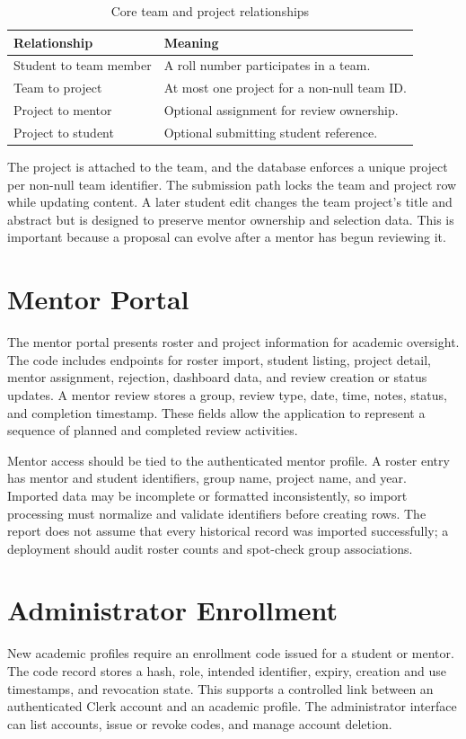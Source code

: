 \documentclass[12pt,a4paper]{report}
\begin{document}
\begin{table}[htbp]\centering\caption{Core team and project relationships}\label{tab:relationships}
\begin{tabular}{p{}p{}}\hline
Relationship & Meaning\\\hline
Student to team member & A roll number participates in a team.\\
Team to project & At most one project for a non-null team ID.\\
Project to mentor & Optional assignment for review ownership.\\
Project to student & Optional submitting student reference.\\\hline
\end{tabular}\end{table}
The project is attached to the team, and the database enforces a unique project per non-null team identifier. The submission path locks the team and project row while updating content. A later student edit changes the team project's title and abstract but is designed to preserve mentor ownership and selection data. This is important because a proposal can evolve after a mentor has begun reviewing it.


\section{Mentor Portal}
The mentor portal presents roster and project information for academic oversight. The code includes endpoints for roster import, student listing, project detail, mentor assignment, rejection, dashboard data, and review creation or status updates. A mentor review stores a group, review type, date, time, notes, status, and completion timestamp. These fields allow the application to represent a sequence of planned and completed review activities.

Mentor access should be tied to the authenticated mentor profile. A roster entry has mentor and student identifiers, group name, project name, and year. Imported data may be incomplete or formatted inconsistently, so import processing must normalize and validate identifiers before creating rows. The report does not assume that every historical record was imported successfully; a deployment should audit roster counts and spot-check group associations.

\section{Administrator Enrollment}
New academic profiles require an enrollment code issued for a student or mentor. The code record stores a hash, role, intended identifier, expiry, creation and use timestamps, and revocation state. This supports a controlled link between an authenticated Clerk account and an academic profile. The administrator interface can list accounts, issue or revoke codes, and manage account deletion.
\end{document}
